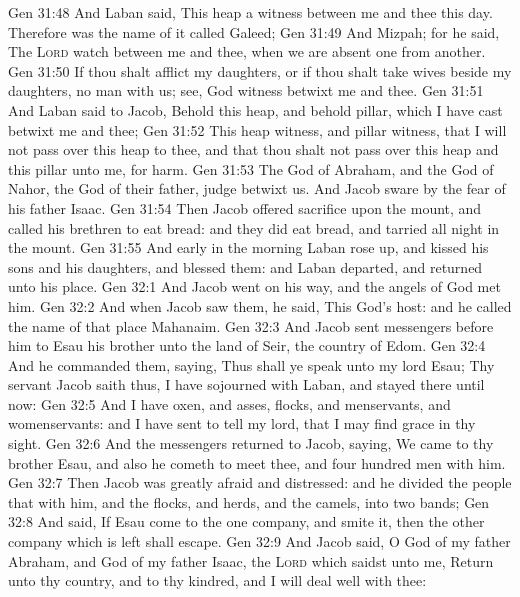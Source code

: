 \vs Gen 31:48 And Laban said, This heap  a witness between me and thee this day. Therefore was the name of it called Galeed;
\vs Gen 31:49 And Mizpah; for he said, The \textsc{Lord} watch between me and thee, when we are absent one from another.
\vs Gen 31:50 If thou shalt afflict my daughters, or if thou shalt take  wives beside my daughters, no man  with us; see, God  witness betwixt me and thee.
\vs Gen 31:51 And Laban said to Jacob, Behold this heap, and behold  pillar, which I have cast betwixt me and thee;
\vs Gen 31:52 This heap  witness, and  pillar  witness, that I will not pass over this heap to thee, and that thou shalt not pass over this heap and this pillar unto me, for harm.
\vs Gen 31:53 The God of Abraham, and the God of Nahor, the God of their father, judge betwixt us. And Jacob sware by the fear of his father Isaac.
\vs Gen 31:54 Then Jacob offered sacrifice upon the mount, and called his brethren to eat bread: and they did eat bread, and tarried all night in the mount.
\vs Gen 31:55 And early in the morning Laban rose up, and kissed his sons and his daughters, and blessed them: and Laban departed, and returned unto his place.
\vs Gen 32:1 And Jacob went on his way, and the angels of God met him.
\vs Gen 32:2 And when Jacob saw them, he said, This  God's host: and he called the name of that place Mahanaim.
\vs Gen 32:3 And Jacob sent messengers before him to Esau his brother unto the land of Seir, the country of Edom.
\vs Gen 32:4 And he commanded them, saying, Thus shall ye speak unto my lord Esau; Thy servant Jacob saith thus, I have sojourned with Laban, and stayed there until now:
\vs Gen 32:5 And I have oxen, and asses, flocks, and menservants, and womenservants: and I have sent to tell my lord, that I may find grace in thy sight.
\vs Gen 32:6 And the messengers returned to Jacob, saying, We came to thy brother Esau, and also he cometh to meet thee, and four hundred men with him.
\vs Gen 32:7 Then Jacob was greatly afraid and distressed: and he divided the people that  with him, and the flocks, and herds, and the camels, into two bands;
\vs Gen 32:8 And said, If Esau come to the one company, and smite it, then the other company which is left shall escape.
\vs Gen 32:9 And Jacob said, O God of my father Abraham, and God of my father Isaac, the \textsc{Lord} which saidst unto me, Return unto thy country, and to thy kindred, and I will deal well with thee:
